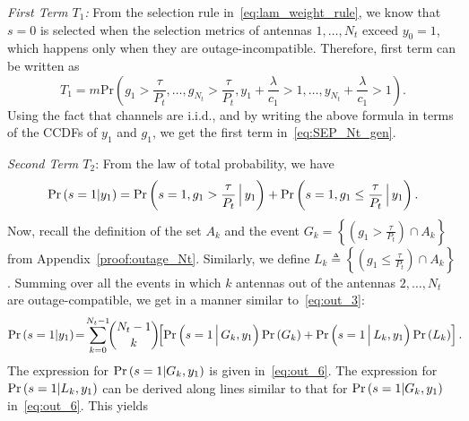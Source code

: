 \documentclass[12pt,draftcls,peerreview,onecolumn]{IEEEtran}
\newcommand{\brac}[1]{\left({#1}\right)}
\newcommand{\define}{\triangleq}
\newcommand{\prob}[1]{\text{Pr}\brac{#1}}
\newcommand{\given}{\arrowvert}
\newcommand{\Given}{\Big\arrowvert}
\newcommand{\nck}[2]{\binom{#1}{#2}}
\newcommand{\setA}{A}
\newcommand{\setAk}{\setA_{k}}
\newcommand{\setG}{G}
\newcommand{\setL}{L}
\newcommand{\setGk}{\setG_k}
\newcommand{\setLk}{\setL_k}
\newcommand{\lam}{\lambda}
\newcommand{\termone}{T_1}
\newcommand{\termtwo}{T_2}
\newcommand{\Nt}{{N_t}}
\newcommand{\Pt}{{P_t}}
\newcommand{\puch}{g}
\newcommand{\gk}[1]{{\puch_{#1}}}
\newcommand{\itau}{\tau}
\newcommand{\cone}{c_{1}}
\newcommand{\m}{\cone}
\newcommand{\taubypt}{\frac{\itau}{\Pt}}
\newcommand{\gkgrtaubypt}[1]{{\gk{#1}}>\taubypt}
\newcommand{\gklttaubypt}[1]{{\gk{#1}}\leq\taubypt}
\newcommand{\lambym}{\frac{\lam}{\m}}
\newcommand{\yk}[1]{y_{#1}}
\newcommand{\zerosep}{m}
\begin{document}
{\em First Term $\termone$:}
From the selection rule in~\eqref{eq:lam_weight_rule}, we know that ${s=0}$ is selected when the selection metrics of antennas $1,\ldots,\Nt$ exceed $\yk{0}=1$, which happens only when they are outage-incompatible. Therefore, first term can be written as 
\begin{equation}
\termone = \zerosep\prob{\gkgrtaubypt{1},\dots,\gkgrtaubypt{\Nt}, \yk{1}\!+\!\lambym >1,\ldots,\yk{\Nt}\!+\!\lambym >1}.
\label{eq:termone_a}
\end{equation}
%
Using the fact that channels are i.i.d., and by writing the above formula in terms of the CCDFs of $\yk{1}$ and $\gk{1}$, we get the first term in~\eqref{eq:SEP_Nt_gen}.


{\em Second Term $\termtwo$}: From the law of total probability, we have 
%
\begin{equation}
\prob{s = 1\given \yk{1}} = \prob{s = 1,\gk{1}>\taubypt\Given\yk{1}}  + \prob{s = 1,\gk{1}\leq\taubypt\Given \yk{1}}. 
\label{eq:pr_s_1}
\end{equation}
%
Now, recall  the definition of the set $\setAk$ and the event  $\setGk=\left\{\left(\gkgrtaubypt{1}\right)\cap\setAk \right\}$ from Appendix~\ref{proof:outage_Nt}. Similarly, we define $\setLk\define\left\{\left(\gklttaubypt{1}\right)\cap\setAk \right\}$. Summing over all the events in which $k$ antennas out of the antennas $2,\ldots,\Nt$ are outage-compatible, we get in a manner similar to~\eqref{eq:out_3}:
\begin{multline}
\prob{s = 1\given \yk{1}} \! =\! \sum_{k=0}^{\Nt-1}\!\!\nck{\Nt-1}{k}\!\! 
\left[ \prob{s = 1 \Given \setGk , \yk{1}} \prob{\setGk} +  \prob{s = 1 \Given \setLk, \yk{1}} \prob{\setLk}\right].\!\! 
\label{eq:pr_s_1_2}
\end{multline}
% 
%
The expression for $\prob{s = 1\given \setGk, \yk{1}}$ is given in~\eqref{eq:out_6}.  The expression for $\prob{s = 1\given \setLk, \yk{1}}$ can be derived along lines similar to that for $\prob{s = 1\given \setGk, \yk{1}}$ in~\eqref{eq:out_6}. This yields   
\end{document}
